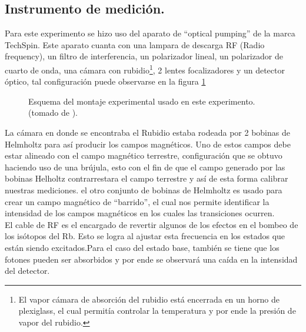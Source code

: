 \documentclass[%
 reprint,
 amsmath,amssymb,
 aps,
]{revtex4-1}
\begin{document}
\subsection{Instrumento de medición.}
Para este experimento se hizo uso del aparato de ``optical pumping'' de la marca TechSpin. Este aparato cuanta con una lampara de descarga RF (Radio frequency), un filtro de interferencia, un polarizador lineal, un polarizador de cuarto de onda, una cámara con rubidio\footnote{El vapor cámara de absorción del rubidio está encerrada en un horno de plexiglass, el cual permitía controlar la temperatura y por ende la presión de vapor del rubidio.}, 2 lentes focalizadores y un detector óptico, tal configuración puede observarse en la figura \ref{montaje experimental}
\begin{figure}[h]
\caption{\label{montaje experimental} Esquema del montaje experimental usado en este experimento.  (tomado de \cite{figura_aparato}).}
\end{figure}
La cámara en donde se encontraba el Rubidio estaba rodeada por 2 bobinas de Helmholtz para así producir los campos magnéticos. Uno de estos campos debe estar alineado con el campo magnético terrestre, configuración que se obtuvo haciendo uso de una brújula, esto con el fin de que el campo generado por las bobinas Helholtz contrarrestara el campo terrestre y así de esta forma calibrar nuestras mediciones. el otro conjunto de bobinas de Helmholtz es usado para crear un campo magnético de ``barrido'', el cual nos permite identificar la intensidad de los campos magnéticos en los cuales las transiciones ocurren.\\
El cable de RF es el encargado de revertir algunos de los efectos en el bombeo de los isótopos del Rb. Esto se logra al ajustar esta frecuencia en los estados que están siendo excitados.Para el caso del estado base, también se tiene que los fotones pueden ser absorbidos y por ende se observará una caída en la intensidad del detector.
\end{document}
